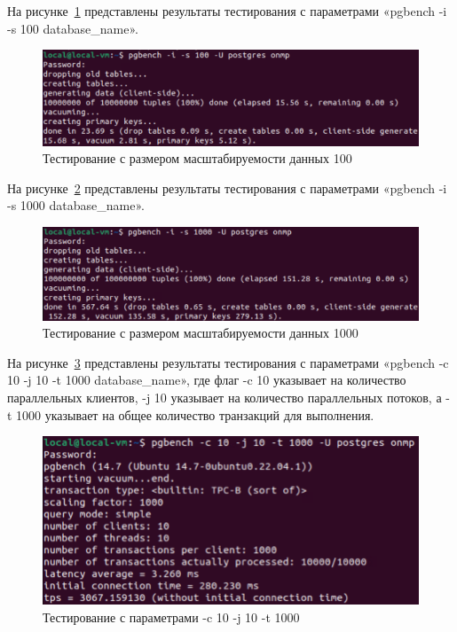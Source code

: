 На рисунке~\ref{fig:b10} представлены результаты тестирования с параметрами «pgbench -i -s 100 database\_name».

\begin{figure}
    \includegraphics[width=16.5cm]{inc/test2_2}
    \caption{Тестирование с размером масштабируемости данных 100}
    \label{fig:b10}
\end{figure}

На рисунке~\ref{fig:b11} представлены результаты тестирования с параметрами «pgbench -i -s 1000 database\_name».

\begin{figure}
    \includegraphics[width=16.5cm]{inc/test2_3}
    \caption{Тестирование с размером масштабируемости данных 1000}
    \label{fig:b11}
\end{figure}

На рисунке~\ref{fig:b12} представлены результаты тестирования с параметрами «pgbench -c 10 -j 10 -t 1000 database\_name», где флаг -c 10 указывает на количество параллельных клиентов, -j 10 указывает на количество параллельных потоков, а -t 1000 указывает на общее количество транзакций для выполнения.

\begin{figure}
    \includegraphics[width=16.5cm]{inc/test2_4}
    \caption{Тестирование с параметрами -c 10 -j 10 -t 1000}
    \label{fig:b12}
\end{figure}

